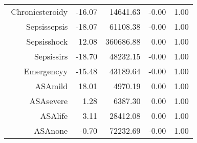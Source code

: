 \begin{tabular}{rrrrr}
$$  Chronic\-steroid\-y & -16.07 & 14641.63 & -0.00 & 1.00 \\ 
  Sepsis\-sepsis & -18.07 & 61108.38 & -0.00 & 1.00 \\ 
  Sepsis\-shock & 12.08 & 360686.88 & 0.00 & 1.00 \\ 
  Sepsis\-sirs & -18.70 & 48232.15 & -0.00 & 1.00 \\ 
  Emergency\-y & -15.48 & 43189.64 & -0.00 & 1.00 \\ 
  ASA\-mild & 18.01 & 4970.19 & 0.00 & 1.00 \\ 
  ASA\-severe & 1.28 & 6387.30 & 0.00 & 1.00 \\ 
  ASA\-life & 3.11 & 28412.08 & 0.00 & 1.00 \\ 
  ASA\-none & -0.70 & 72232.69 & -0.00 & 1.00 \\ 
   \hline
\end{tabular}

